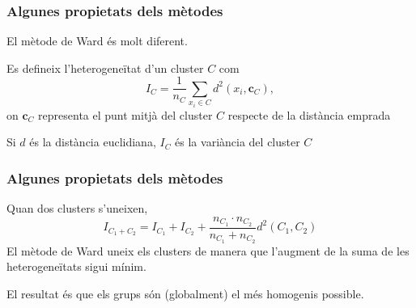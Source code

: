 \documentclass[12pt,t]{beamer}
\renewcommand{\emph}[1]{{\color{red}#1}}
\theoremstyle{plain}
\theoremstyle{definition}
\begin{document}
\begin{frame}
\frametitle{Algunes propietats dels mètodes}

El mètode de Ward és molt diferent. 
\medskip

Es defineix l'\emph{heterogeneïtat} d'un cluster $C$ com
$$
I_C = \frac{1}{n_C} \sum_{x_i\in C} d^2(x_i,\mathbf{c}_C),
$$
on $\mathbf{c}_C$ representa el punt mitjà del cluster $C$ respecte de la distància emprada
\medskip

Si $d$ és la distància euclidiana, $I_C$ és la variància del cluster $C$
\end{frame}

\begin{frame}
\frametitle{Algunes propietats dels mètodes}

Quan dos clusters s'uneixen, 
$$
I_{C_1+C_2}=I_{C_1}+I_{C_2}+\frac{n_{C_1}\cdot n_{C_2}}{n_{C_1}+ n_{C_2}} d^2 (C_1,C_2)
$$
El mètode de Ward uneix els clusters de manera que l'augment de la suma de les heterogeneïtats sigui mínim.
\medskip


El resultat és que els grups són (globalment) el més homogenis possible.
\end{frame}
\end{document}
